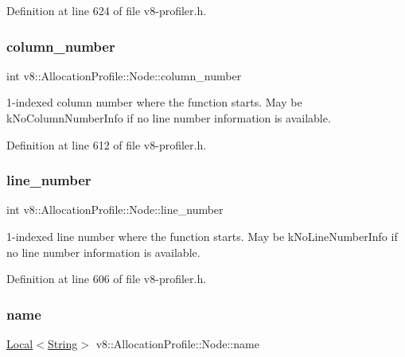 Definition at line 624 of file v8-\/profiler.\+h.

\mbox{\label{structv8_1_1AllocationProfile_1_1Node_a7cf86acc298428c858673fc1f9dbe305}} 
\subsubsection{\texorpdfstring{column\+\_\+number}{column\_number}}
{\footnotesize\ttfamily int v8\+::\+Allocation\+Profile\+::\+Node\+::column\+\_\+number}

1-\/indexed column number where the function starts. May be k\+No\+Column\+Number\+Info if no line number information is available. 

Definition at line 612 of file v8-\/profiler.\+h.

\mbox{\label{structv8_1_1AllocationProfile_1_1Node_ac9773c92a3af3a9a9420337599e68bd9}} 
\subsubsection{\texorpdfstring{line\+\_\+number}{line\_number}}
{\footnotesize\ttfamily int v8\+::\+Allocation\+Profile\+::\+Node\+::line\+\_\+number}

1-\/indexed line number where the function starts. May be k\+No\+Line\+Number\+Info if no line number information is available. 

Definition at line 606 of file v8-\/profiler.\+h.

\mbox{\label{structv8_1_1AllocationProfile_1_1Node_af9f2c323d6a11e836c02e8ac88adc5a8}} 
\subsubsection{\texorpdfstring{name}{name}}
{\footnotesize\ttfamily \mbox{\hyperlink{classv8_1_1Local}{Local}}$<$\mbox{\hyperlink{classv8_1_1String}{String}}$>$ v8\+::\+Allocation\+Profile\+::\+Node\+::name}

